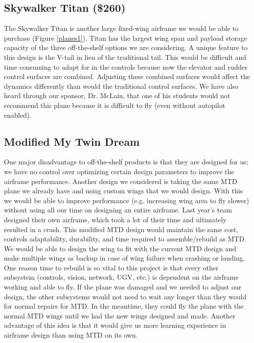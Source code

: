 \documentclass[]{auvsi_doc}
\begin{document}
\subsection*{Skywalker Titan (\$260)}

The Skywalker Titan is another large fixed-wing airframe we would be able to purchase (Figure \ref{planes1}). Titan has the largest wing span and payload storage capacity of the three off-the-shelf options we are considering. A unique feature to this design is the V-tail in lieu of the traditional tail. This would be difficult and time consuming to adapt for in the controls because now the elevator and rudder control surfaces are combined. Adjusting these combined surfaces would affect the dynamics differently than would the traditional control surfaces. We have also heard through our sponsor, Dr. McLain, that one of his students would not recommend this plane because it is difficult to fly (even without autopilot enabled).

\subsection*{Modified My Twin Dream}

One major disadvantage to off-the-shelf products is that they are designed for us; we have no control over optimizing certain design parameters to improve the airframe performance. Another design we considered is taking the same MTD plane we already have and using custom wings that we would design. With this we would be able to improve performance (e.g. increasing wing area to fly slower) without using all our time on designing an entire airframe. Last year's team designed their own airframe, which took a lot of their time and ultimately resulted in a crash. This modified MTD design would maintain the same cost, controls adaptability, durability, and time required to assemble/rebuild as MTD. We would be able to design the wing to fit with the current MTD design and make multiple wings as backup in case of wing failure when crashing or landing. One reason time to rebuild is so vital to this project is that every other subsystem (controls, vision, network, UGV, etc.) is dependent on the airframe working and able to fly. If the plane was damaged and we needed to adjust our design, the other subsystems would not need to wait any longer than they would for normal repairs for MTD. In the meantime, they could fly the plane with the normal MTD wings until we had the new wings designed and made. Another advantage of this idea is that it would give us more learning experience in airframe design than using MTD on its own.
\end{document}
